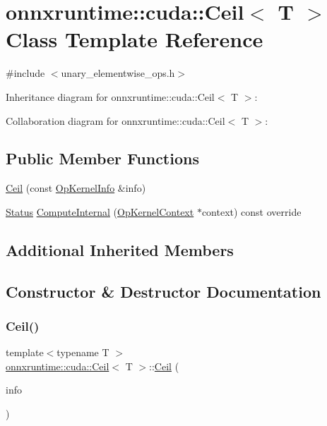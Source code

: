 \hypertarget{classonnxruntime_1_1cuda_1_1Ceil}{}\section{onnxruntime\+:\+:cuda\+:\+:Ceil$<$ T $>$ Class Template Reference}
\label{classonnxruntime_1_1cuda_1_1Ceil}


{\ttfamily \#include $<$unary\+\_\+elementwise\+\_\+ops.\+h$>$}



Inheritance diagram for onnxruntime\+:\+:cuda\+:\+:Ceil$<$ T $>$\+:


Collaboration diagram for onnxruntime\+:\+:cuda\+:\+:Ceil$<$ T $>$\+:
\subsection*{Public Member Functions}
\begin{DoxyCompactItemize}
\item 
\mbox{\hyperlink{classonnxruntime_1_1cuda_1_1Ceil_ad80e903550ff45abc6cbfe7899fc95f8}{Ceil}} (const \mbox{\hyperlink{classonnxruntime_1_1OpKernelInfo}{Op\+Kernel\+Info}} \&info)
\item 
\mbox{\hyperlink{classonnxruntime_1_1common_1_1Status}{Status}} \mbox{\hyperlink{classonnxruntime_1_1cuda_1_1Ceil_a9126a17817969afaf0c4bcf827907782}{Compute\+Internal}} (\mbox{\hyperlink{classonnxruntime_1_1OpKernelContext}{Op\+Kernel\+Context}} $\ast$context) const override
\end{DoxyCompactItemize}
\subsection*{Additional Inherited Members}


\subsection{Constructor \& Destructor Documentation}
\mbox{\label{classonnxruntime_1_1cuda_1_1Ceil_ad80e903550ff45abc6cbfe7899fc95f8}} 
\subsubsection{\texorpdfstring{Ceil()}{Ceil()}}
{\footnotesize\ttfamily template$<$typename T $>$ \\
\mbox{\hyperlink{classonnxruntime_1_1cuda_1_1Ceil}{onnxruntime\+::cuda\+::\+Ceil}}$<$ T $>$\+::\mbox{\hyperlink{classonnxruntime_1_1cuda_1_1Ceil}{Ceil}} (\begin{DoxyParamCaption}\item[{const \mbox{\hyperlink{classonnxruntime_1_1OpKernelInfo}{Op\+Kernel\+Info}} \&}]{info }\end{DoxyParamCaption})\hspace{0.3cm}{\ttfamily [inline]}}



